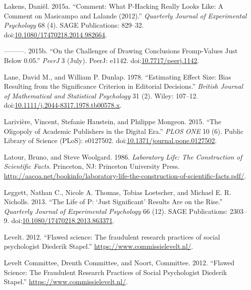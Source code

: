 \documentclass[a5paper]{book}
\begin{document}
\hypertarget{ref-doi:10.1080ux2f17470218.2014.982664}{}
Lakens, Daniël. 2015a. ``Comment: What P-Hacking Really Looks Like: A
Comment on Masicampo and Lalande (2012).'' \emph{Quarterly Journal of
Experimental Psychology} 68 (4). SAGE Publications: 829--32.
doi:\href{https://doi.org/10.1080/17470218.2014.982664}{10.1080/17470218.2014.982664}.

\hypertarget{ref-doi:10.7717ux2fpeerj.1142}{}
---------. 2015b. ``On the Challenges of Drawing Conclusions
Fromp-Values Just Below 0.05.'' \emph{PeerJ} 3 (July). PeerJ: e1142.
doi:\href{https://doi.org/10.7717/peerj.1142}{10.7717/peerj.1142}.

\hypertarget{ref-doi:10.1111ux2fj.2044-8317.1978.tb00578.x}{}
Lane, David M., and William P. Dunlap. 1978. ``Estimating Effect Size:
Bias Resulting from the Significance Criterion in Editorial Decisions.''
\emph{British Journal of Mathematical and Statistical Psychology} 31
(2). Wiley: 107--12.
doi:\href{https://doi.org/10.1111/j.2044-8317.1978.tb00578.x}{10.1111/j.2044-8317.1978.tb00578.x}.

\hypertarget{ref-doi:10.1371ux2fjournal.pone.0127502}{}
Larivière, Vincent, Stefanie Haustein, and Philippe Mongeon. 2015. ``The
Oligopoly of Academic Publishers in the Digital Era.'' \emph{PLOS ONE}
10 (6). Public Library of Science (PLoS): e0127502.
doi:\href{https://doi.org/10.1371/journal.pone.0127502}{10.1371/journal.pone.0127502}.

\hypertarget{ref-isbn:0692094187}{}
Latour, Bruno, and Steve Woolgard. 1986. \emph{Laboratory Life: The
Construction of Scientific Facts}. Princeton, NJ: Princeton University
Press.
\url{http://aacoa.net/bookinfo/laboratory-life-the-construction-of-scientific-facts.pdf/}.

\hypertarget{ref-doi:10.1080ux2f17470218.2013.863371}{}
Leggett, Nathan C., Nicole A. Thomas, Tobias Loetscher, and Michael E.
R. Nicholls. 2013. ``The Life of P: `Just Significant' Results Are on
the Rise.'' \emph{Quarterly Journal of Experimental Psychology} 66 (12).
SAGE Publications: 2303--9.
doi:\href{https://doi.org/10.1080/17470218.2013.863371}{10.1080/17470218.2013.863371}.

\hypertarget{ref-Levelt2012}{}
Levelt. 2012. ``Flawed science: The fraudulent research practices of
social psychologist Diederik Stapel.''
\url{https://www.commissielevelt.nl/}.

\hypertarget{ref-levelt2012}{}
Levelt Committee, Drenth Committee, and Noort, Committee. 2012. ``Flawed
Science: The Fraudulent Research Practices of Social Psychologist
Diederik Stapel.'' \url{https://www.commissielevelt.nl/}.
\end{document}
